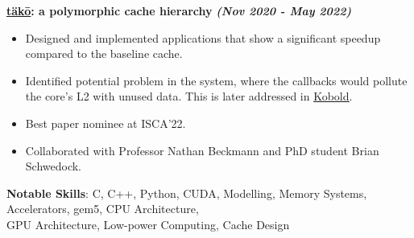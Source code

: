 \documentclass[10pt]{article}
\begin{document}
  \textbf{\large \href{https://dl.acm.org/doi/10.1145/3470496.3527379}{\underline{täkō}}: a polymorphic cache hierarchy} {\hfill \textit{\textbf{(Nov 2020 - May 2022)}}} 
  \vspace*{-0.17cm}
  \begin{itemize}
    \itemsep0em
    \item \textcolor{lighterG}{Designed and implemented applications that show a significant speedup compared to the baseline cache.}
    \item \textcolor{lighterG}{Identified potential problem in the system, where the callbacks would pollute the core's L2 with unused data. This is later addressed in \href{https://ieeexplore.ieee.org/document/10106564}{\underline{Kobold}}.}
    \item \textcolor{lighterG}{Best paper nominee at ISCA'22.}
    \item \textcolor{lighterG}{Collaborated with Professor Nathan Beckmann and PhD student Brian Schwedock.}
  \end{itemize}

  \vspace{0.5cm}
  \textbf{\large{Notable Skills}}: C, C++, Python, CUDA, Modelling, Memory Systems, Accelerators, gem5, CPU Architecture, \\ GPU Architecture, Low-power Computing, Cache Design
\end{document}
